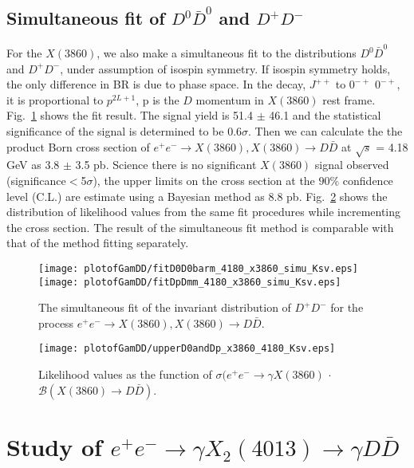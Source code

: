 \documentclass[aps,preprint,tightenlines,superscriptaddress,showpacs,byrevtex,amsmath,amssymb,nofloatfix]{revtex4}
\begin{document}
\subsection{Simultaneous fit of $D^{0}\bar{D}^{0}$ and $D^{+}D^{-}$}

For the $X(3860)$, we also  make a simultaneous fit to the distributions $D^{0}\bar{D}^{0}$ and $D^{+}D^{-}$, under assumption of isospin symmetry. If isospin symmetry holds, the only difference in BR is due to phase space. In the decay, $J^{++}$ to $0^{-+}$ $0^{-+}$, it is proportional to $p^{2L+1}$, p is the $D$ momentum in $X(3860)$ rest frame. Fig.~\ref{fitmDDbar_simu_3860} shows the fit result. The signal yield is 51.4 $\pm$ 46.1 and the statistical significance of the signal is determined to be 0.6$\sigma$. Then we can calculate the the product Born cross section of $e^{+}e^{-} \rightarrow X(3860), X(3860) \rightarrow D\bar{D}$ at $\sqrt{s}$ = 4.18 GeV as 3.8 $\pm$ 3.5 pb. Science there is no significant $X(3860)$ signal observed (significance$<$5$\sigma$), the upper limits on the cross section at the $90\%$ confidence level (C.L.) are estimate using a Bayesian method as 8.8 pb. Fig.~\ref{FitDDbar_simu_3860_up} shows the distribution of likelihood values from the same fit procedures while incrementing the cross section. The result of the simultaneous fit method is comparable with that of the method fitting separately.

\begin{figure}[!htbp]
  \captionsetup{justification=raggedright}
  \texttt{[image: plotofGamDD/fitD0D0barm\_4180\_x3860\_simu\_Ksv.eps]}
  \texttt{[image: plotofGamDD/fitDpDmm\_4180\_x3860\_simu\_Ksv.eps]}
  \caption{\small The simultaneous fit of the invariant distribution of $D^{+}D^{-}$ for the process $e^{+}e^{-} \rightarrow X(3860), X(3860) \rightarrow D\bar{D}$.}
  \label{fitmDDbar_simu_3860}
\end{figure}

\begin{figure}[!htbp]
\captionsetup{justification=raggedright}
    \texttt{[image: plotofGamDD/upperD0andDp\_x3860\_4180\_Ksv.eps]}

  \caption{\small Likelihood values as the function of $\sigma (e^{+}e^{-}\rightarrow \gamma X(3860)$ $\cdot$ $\mathcal{B}(X(3860)\rightarrow  D\bar{D})$.}
  \label{FitDDbar_simu_3860_up}
\end{figure}


\section{Study of $e^{+}e^{-}\rightarrow \gamma X_{2}(4013)\rightarrow \gamma D\bar{D}$}
\end{document}
